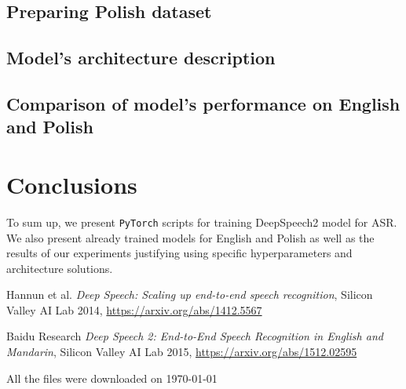 \documentclass[licencjacka,en]{pracamgr}
\newcommand{\bibDownloadDate}{\today}
\begin{document}
\section{Preparing Polish dataset}
\section{Model’s architecture description}
\section{Comparison of model's performance on English and Polish}


\chapter{Conclusions}\label{r:concls}

To sum up, we present \texttt{PyTorch} scripts for training DeepSpeech2 model for ASR. We also present already trained models for English and Polish as well as the results of our experiments justifying using specific hyperparameters and architecture solutions.\\

\begin{thebibliography}{99}

 Hannun et al. 
\textit{Deep Speech: Scaling up end-to-end speech recognition}, Silicon Valley AI Lab 2014, \href{https://arxiv.org/abs/1412.5567}{https://arxiv.org/abs/1412.5567}
  
 Baidu Research \textit{ Deep Speech 2: End-to-End Speech Recognition in English and Mandarin}, Silicon Valley AI Lab 2015, \href{https://arxiv.org/abs/1512.02595}{https://arxiv.org/abs/1512.02595}
  
\end{thebibliography}
All the files were downloaded on \bibDownloadDate
\end{document}

